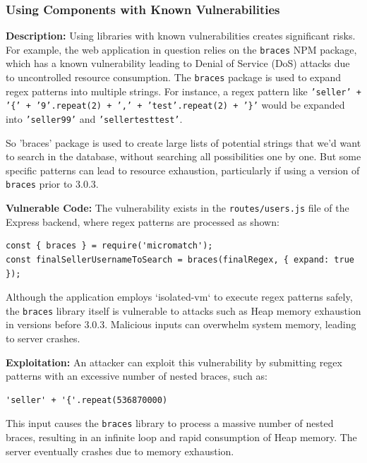 \documentclass[]{article}
\begin{document}
\subsubsection{Using Components with Known Vulnerabilities}

\textbf{Description:}
Using libraries with known vulnerabilities creates significant risks. For example, the web application in question relies on the \texttt{braces} NPM package, which has a known vulnerability leading to Denial of Service (DoS) attacks due to uncontrolled resource consumption. The \texttt{braces} package is used to expand regex patterns into multiple strings. For instance, a regex pattern like \texttt{'seller' + '\{' + '9'.repeat(2) + ',' + 'test'.repeat(2) + '\}'} would be expanded into \texttt{'seller99'} and \texttt{'sellertesttest'}.

So 'braces' package is used to create large lists of potential strings that we'd want to search in the database, without searching all possibilities one by one. But some specific patterns can lead to resource exhaustion, particularly if using a version of \texttt{braces} prior to 3.0.3.

\textbf{Vulnerable Code:}
The vulnerability exists in the \texttt{routes/users.js} file of the Express backend, where regex patterns are processed as shown:

\begin{lstlisting}
const { braces } = require('micromatch');
const finalSellerUsernameToSearch = braces(finalRegex, { expand: true });
\end{lstlisting}

Although the application employs `isolated-vm` to execute regex patterns safely, the \texttt{braces} library itself is vulnerable to attacks such as Heap memory exhaustion in versions before 3.0.3. Malicious inputs can overwhelm system memory, leading to server crashes.

\textbf{Exploitation:}
An attacker can exploit this vulnerability by submitting regex patterns with an excessive number of nested braces, such as:

\begin{lstlisting}
'seller' + '{'.repeat(536870000)
\end{lstlisting}

This input causes the \texttt{braces} library to process a massive number of nested braces, resulting in an infinite loop and rapid consumption of Heap memory. The server eventually crashes due to memory exhaustion. 
\end{document}
